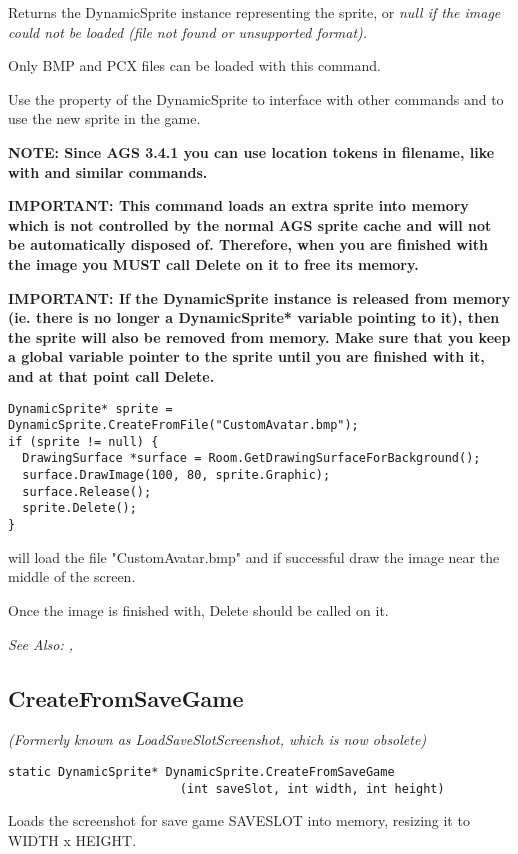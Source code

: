 Returns the DynamicSprite instance representing the sprite, or \it{null} if the image
could not be loaded (file not found or unsupported format).

Only BMP and PCX files can be loaded with this command.

Use the  property of the DynamicSprite to
interface with other commands and to use the new sprite in the game.

\bf{NOTE:} Since AGS 3.4.1 you can use location tokens in filename, like with  and similar commands.

\bf{IMPORTANT:} This command loads an extra sprite into memory which is not controlled
by the normal AGS sprite cache and will not be automatically disposed of. Therefore, when
you are finished with the image you \bf{MUST} call Delete on it to free its memory.

\bf{IMPORTANT:} If the DynamicSprite instance is released from memory (ie. there is
no longer a DynamicSprite* variable pointing to it), then the sprite will also be
removed from memory. Make sure that you keep a global variable pointer to the sprite
until you are finished with it, and at that point call Delete.

\begin{verbatim}
DynamicSprite* sprite = DynamicSprite.CreateFromFile("CustomAvatar.bmp");
if (sprite != null) {
  DrawingSurface *surface = Room.GetDrawingSurfaceForBackground();
  surface.DrawImage(100, 80, sprite.Graphic);
  surface.Release();
  sprite.Delete();
}
\end{verbatim}
will load the file "CustomAvatar.bmp" and if successful draw the image near the middle
of the screen.

Once the image is finished with, Delete should be called on it.

\it{See Also:} ,


\subsection{CreateFromSaveGame}\label{DynamicSprite.CreateFromSaveGame}%

\it{(Formerly known as LoadSaveSlotScreenshot, which is now obsolete)}

\begin{verbatim}
static DynamicSprite* DynamicSprite.CreateFromSaveGame
                        (int saveSlot, int width, int height)
\end{verbatim}
Loads the screenshot for save game SAVESLOT into memory, resizing it to WIDTH x HEIGHT.

